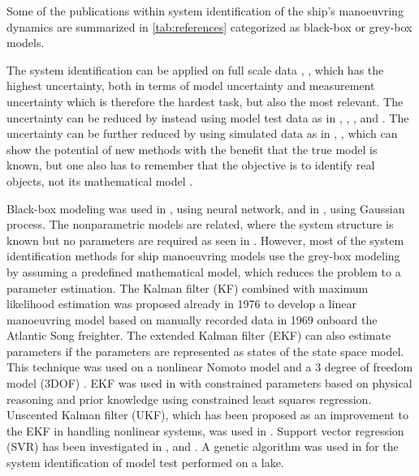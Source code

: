 Some of the publications within system identification of the ship's manoeuvring dynamics are summarized in \autoref{tab:references} categorized as black-box or grey-box models.
 
\noindent The system identification can be applied on full scale data \cite{astrom_identification_1976}, \cite{perera_system_2015}, \cite{revestido_herrero_two-step_2012} which has the highest uncertainty, both in terms of model uncertainty and measurement uncertainty which is therefore the hardest task, but also the most relevant. The uncertainty can be reduced by instead using model test data as in \cite{araki_estimating_2012}, \cite{he_nonparametric_2022}, \cite{xue_identification_2021}, \cite{miller_ship_2021} and \cite{luo_parameter_2016} . The uncertainty can be further reduced by using simulated data as in \cite{shi_identification_2009}, \cite{zhu_parameter_2017}, \cite{wang_parameter_2021} which can show the potential of new methods with the benefit that the true model is known, but one also has to remember that the objective is to identify real objects, not its mathematical model \cite{miller_ship_2021}.

\noindent Black-box modeling was used in \cite{he_nonparametric_2022}, using neural network, and in \cite{xue_identification_2021}, using Gaussian process. The nonparametric models are related, where the system structure is known but no parameters are required as seen in \cite{pongduang_nonparametric_2020}. However, most of the system identification methods for ship manoeuvring models use the grey-box modeling by assuming a predefined mathematical model, which reduces the problem to a parameter estimation.
The Kalman filter (KF) combined with maximum likelihood estimation was proposed already in 1976 \cite{astrom_identification_1976} to develop a linear manoeuvring model based on manually recorded data in 1969 onboard the Atlantic Song freighter. The extended Kalman filter (EKF) can also estimate parameters if the parameters are represented as states of the state space model. This technique was used on a nonlinear Nomoto model \cite{perera_system_2015} and a 3 degree of freedom model (3DOF) \cite{shi_identification_2009}. EKF was used in \cite{araki_estimating_2012} with constrained parameters based on physical reasoning and prior knowledge using constrained least squares regression. Unscented Kalman filter (UKF), which has been proposed as an improvement to the EKF in handling nonlinear systems, was used in \cite{revestido_herrero_two-step_2012}.
Support vector regression (SVR) has been investigated in \cite{zhu_parameter_2017}, \cite{wang_parameter_2021} and \cite{luo_parameter_2016}. A genetic algorithm was used in \cite{miller_ship_2021} for the system identification of model test performed on a lake.





